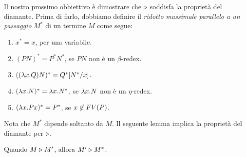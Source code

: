 \documentclass{article}
\begin{document}
Il nostro prossimo obbiettivo \`e dimostrare che $\mathrel{\triangleright}$ soddisfa la
propriet\`a del diamante. Prima di farlo, dobbiamo definire il {\em ridotto
	massimale parallelo a un passaggio} $M^*$ di un termine $M$ come segue:

\begin{enumerate}
\item $x^* = x$, per una variabile.
\item $(PN)^* = P^*N^*$, se $PN$ non \`e un $\beta$-redex. 
\item $((\lambda x.Q)N)^* = Q^*[N^*/x]$.
\item $(\lambda x.N)^* = \lambda x.N^*$, se $\lambda x.N$ non \`e un 
        $\eta$-redex.
\item $(\lambda x.Px)^* = P^*$, se $x\not\in FV(P)$.
\end{enumerate}

Nota che $M^*$ dipende soltanto da $M$. Il seguente lemma implica la
propriet\`a del diamante per $\mathrel{\triangleright}$.

\begin{lemma}
\label{lem-max-par}
  Quando $M \mathrel{\triangleright} M'$, allora $M' \mathrel{\triangleright} M^*$.
\end{lemma}
\end{document}
